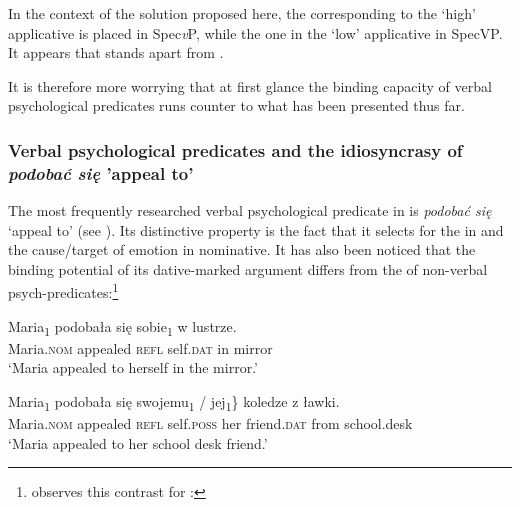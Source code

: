 \documentclass[output=paper,nonflat,colorlinks,citecolor=brown,newtxmath]{langsci/langscibook}
\begin{document}
\noindent In the context of the solution proposed here, the  corresponding to the ‘high’ applicative is placed in Spec\textit{v}P, while the one in the ‘low’ applicative in SpecVP. It appears that   stands apart from .

It is therefore more worrying that at first glance the binding capacity of verbal psychological predicates runs counter to what has been presented thus far.

\subsubsection{Verbal psychological predicates and the idiosyncrasy of \textit{podobać się} ’appeal to’} \label{s3.2.2}

The most frequently researched verbal psychological predicate in  is \textit{podobać się} ‘appeal to’ (see \citealt{miechowicz2008,bondaruk2007,zychlinski2013,jimenezfernandez2016,bondaruketal2017}). Its distinctive property is the fact that it selects for the  in  and the cause/target of emotion in nominative. It has also been noticed that the binding potential of its dative-marked argument differs from the  of non-verbal psych-predicates:\footnote{\label{fn23}\cite[253]{franks1995} observes this contrast for :
\z
{}
\z
{}
\zlast}

\ea \label{ex:witkos:41}
\gll Maria\textsubscript{1} podobała się sobie\textsubscript{1} w lustrze.\\
 Maria.\textsc{nom} appealed \textsc{refl} self.\textsc{dat} in mirror\\
\glt `Maria appealed to herself in the mirror.'
\z

\ea \label{ex:witkos:42}
\gll Maria\textsubscript{1} podobała się \minsp{\{} swojemu\textsubscript{1} / \minsp{*} jej\textsubscript{1}\} koledze z ławki.\\
 Maria.\textsc{nom} appealed \textsc{refl} {} self.\textsc{poss} {} {} her friend.\textsc{dat} from school.desk\\
\glt `Maria appealed to her school desk friend.'
\z
\end{document}
